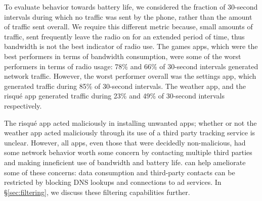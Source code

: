     To evaluate behavior towards battery life, we considered the fraction of 30-second intervals during which no traffic was sent by the phone, rather than the amount of traffic sent overall. 
    We require this different metric because, \eg{} small amounts of traffic, sent frequently leave the radio on for an extended period of time, thus bandwidth is not the best indicator of radio use.
    The games apps, which were the best performers in terms of bandwidth consumption, were some of the worst performers in terms of radio usage: 78\% and 66\% of 30-second intervals generated network traffic.
    However, the worst performer overall was the settings app, which generated traffic during 85\% of 30-second intervals.
    The weather app, and the risqu\'{e} app generated traffic during 23\% and 49\% of 30-second intervals respectively.

    The risqu\'{e} app acted maliciously in installing unwanted apps; whether or not the weather app acted maliciously through its use of a third party tracking service is unclear.
    However, all apps, even those that were decidedly non-malicious, had some network behavior worth some concern by contacting multiple third parties and making inneficient use of bandwidth and battery life.
    \meddle can help ameliorate some of these concerns: data consumption and third-party contacts can be restricted by blocking DNS lookups and connections to ad services. 
    In \S\ref{sec:filtering}, we discuss these filtering capabilities further.


